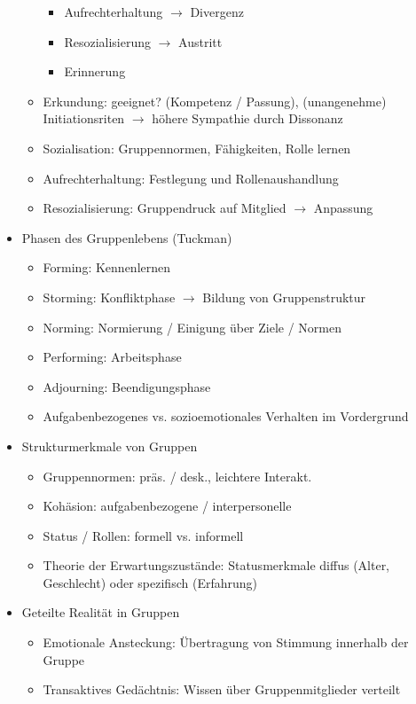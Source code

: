 \documentclass[11pt, paper=a4, twocolumn]{scrartcl}
\begin{document}
\begin{itemize}
\begin{itemize}
\begin{itemize}
							\item Aufrechterhaltung $\rightarrow$ Divergenz
							\item Resozialisierung $\rightarrow$ Austritt
							\item Erinnerung
						\end{itemize}
					\item Erkundung: geeignet? (Kompetenz / Passung), (unangenehme) Initiationsriten $\rightarrow$ höhere Sympathie 
						durch Dissonanz
					\item Sozialisation: Gruppennormen, Fähigkeiten, Rolle lernen
					\item Aufrechterhaltung: Festlegung und Rollenaushandlung
					\item Resozialisierung: Gruppendruck auf Mitglied $\rightarrow$ Anpassung
				\end{itemize}
			\item Phasen des Gruppenlebens (Tuckman)
				\begin{itemize}
					\item Forming: Kennenlernen
					\item Storming: Konfliktphase $\rightarrow$ Bildung von Gruppenstruktur
					\item Norming: Normierung / Einigung über Ziele / Normen
					\item Performing: Arbeitsphase
					\item Adjourning: Beendigungsphase
					\item Aufgabenbezogenes vs. sozioemotionales Verhalten im Vordergrund
				\end{itemize}
			\item Strukturmerkmale von Gruppen
				\begin{itemize}
					\item Gruppennormen: präs. / desk., leichtere Interakt.
					\item Kohäsion: aufgabenbezogene / interpersonelle
					\item Status / Rollen: formell vs. informell
					\item Theorie der Erwartungszustände: Statusmerkmale diffus (Alter, Geschlecht) oder spezifisch (Erfahrung)
				\end{itemize}
			\item Geteilte Realität in Gruppen
				\begin{itemize}
					\item Emotionale Ansteckung: Übertragung von Stimmung innerhalb der Gruppe
					\item Transaktives Gedächtnis: Wissen über Gruppenmitglieder verteilt

\end{itemize}
\end{itemize}
\end{document}
